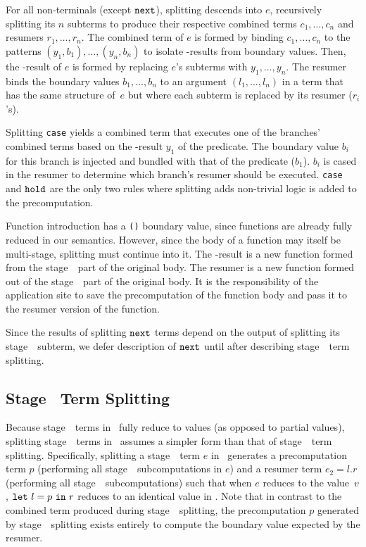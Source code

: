 
For all non-terminals (except ${\tt next}$),
splitting descends into $e$, recursively splitting its $n$ subterms
to produce their respective combined terms $c_1,\ldots,c_n$ and resumers $r_1, \ldots, r_n$.
The combined term of $e$ is formed by binding $c_1,\ldots,c_n$
to the patterns $(y_1,b_1),\ldots,(y_n,b_n)$
to isolate \bbone-results from boundary values. Then,
the \bbone-result of $e$ is formed by replacing $e$'s subterms with $y_1,\ldots,y_n$.
The resumer binds the boundary values $b_1,\ldots,b_n$ to an
argument $(l_1,\ldots,l_n)$ in a term that has the same structure
of~$e$ but where each subterm is replaced by its resumer ($r_i$'s).

Splitting {\tt case} yields a combined term that executes one of the branches' combined terms based on the \bbone-result $y_1$ of the predicate.
The boundary value $b_i$ for this branch is injected and bundled with that of the predicate ($b_1$).   
$b_i$ is cased in the resumer to determine which branch's resumer should be executed.
{\tt case} and ${\tt hold}$ are the only two rules where splitting adds non-trivial logic is added to the precomputation.

Function introduction has a \texttt{()} boundary value,
since functions are already fully reduced in our semantics.
However, since the body of a function may itself be multi-stage, splitting must continue into it.
The \bbone-result is a new function formed from the stage~\bbone\ part of the original body.
The resumer is a new function formed out of the stage~\bbtwo\ part of the original body.
It is the responsibility of the application site to save the precomputation of the function body
and pass it to the resumer version of the function.

Since the results of splitting ${\tt next}$ terms depend on the output of splitting its stage~\bbtwo\ subterm,
we defer description of ${\tt next}$ until after describing stage~\bbtwo\ term splitting.

\subsection{Stage \bbtwo\ Term Splitting}

Because stage~\bbtwo\ terms in \lang\ fully reduce to values (as opposed to partial values),
splitting stage~\bbtwo\ terms in \lang\ assumes a simpler form than that of stage~\bbone\ term splitting. 
Specifically, splitting a stage~\bbtwo\ term $e$ in \lang\ generates a precomputation term $p$
(performing all stage~\bbone\ subcomputations in $e$) and a
resumer term $e_2=l.r$ (performing all stage~\bbtwo\ subcomputations) such that when 
$e$ reduces to the value~$v$, ${\tt let}~{l} = {p}~{\tt in}~{r}$ reduces to an identical value in \langmono.
Note that in contrast to the combined term produced during stage~\bbone\ splitting,
the precomputation $p$ generated by stage~\bbtwo\ splitting exists entirely
to compute the boundary value expected by the resumer.

